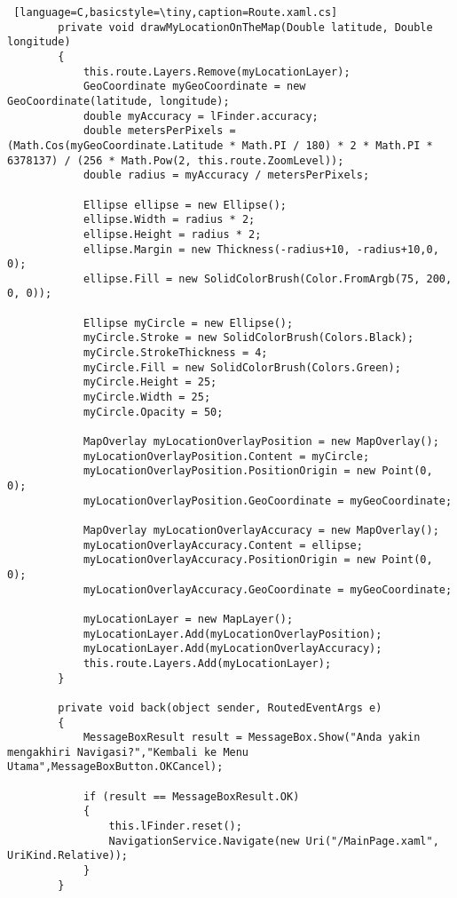 \begin{lstlisting} [language=C,basicstyle=\tiny,caption=Route.xaml.cs]
        private void drawMyLocationOnTheMap(Double latitude, Double longitude)
        {
            this.route.Layers.Remove(myLocationLayer);
            GeoCoordinate myGeoCoordinate = new GeoCoordinate(latitude, longitude);
            double myAccuracy = lFinder.accuracy; 
            double metersPerPixels = (Math.Cos(myGeoCoordinate.Latitude * Math.PI / 180) * 2 * Math.PI * 6378137) / (256 * Math.Pow(2, this.route.ZoomLevel));
            double radius = myAccuracy / metersPerPixels;

            Ellipse ellipse = new Ellipse();
            ellipse.Width = radius * 2;
            ellipse.Height = radius * 2;
            ellipse.Margin = new Thickness(-radius+10, -radius+10,0, 0);
            ellipse.Fill = new SolidColorBrush(Color.FromArgb(75, 200, 0, 0));

            Ellipse myCircle = new Ellipse();
            myCircle.Stroke = new SolidColorBrush(Colors.Black);
            myCircle.StrokeThickness = 4;
            myCircle.Fill = new SolidColorBrush(Colors.Green);
            myCircle.Height = 25;
            myCircle.Width = 25;
            myCircle.Opacity = 50;

            MapOverlay myLocationOverlayPosition = new MapOverlay();
            myLocationOverlayPosition.Content = myCircle;
            myLocationOverlayPosition.PositionOrigin = new Point(0, 0);
            myLocationOverlayPosition.GeoCoordinate = myGeoCoordinate;

            MapOverlay myLocationOverlayAccuracy = new MapOverlay();
            myLocationOverlayAccuracy.Content = ellipse;
            myLocationOverlayAccuracy.PositionOrigin = new Point(0, 0);
            myLocationOverlayAccuracy.GeoCoordinate = myGeoCoordinate;

            myLocationLayer = new MapLayer();
            myLocationLayer.Add(myLocationOverlayPosition);
            myLocationLayer.Add(myLocationOverlayAccuracy);
            this.route.Layers.Add(myLocationLayer);
        }

        private void back(object sender, RoutedEventArgs e)
        {
            MessageBoxResult result = MessageBox.Show("Anda yakin mengakhiri Navigasi?","Kembali ke Menu Utama",MessageBoxButton.OKCancel);

            if (result == MessageBoxResult.OK)
            {
                this.lFinder.reset();
                NavigationService.Navigate(new Uri("/MainPage.xaml", UriKind.Relative));
            }
        }


\end{lstlisting}

